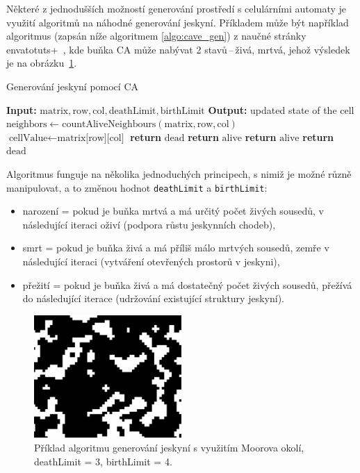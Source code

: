 Některé z jednodušších možností generování prostředí s celulárními automaty je využití algoritmů na náhodné generování jeskyní. Příkladem může být například algoritmus (zapsán níže algoritmem \ref{algo:cave_gen}) z naučné stránky envatotuts+~\cite{CaveCA}, kde buňka CA může nabývat 2 stavů\,--\,živá, mrtvá, jehož výsledek je na obrázku~\ref{fig:cave}.
\begin{algorithm}
\caption{Generování jeskyní pomocí CA}\label{algo:cave_gen}
\begin{algorithmic}[1]
\State \textbf{Input:} $\text{matrix}, \text{row}, \text{col}, \text{deathLimit}, \text{birthLimit}$
\State \textbf{Output:} updated state of the cell
\State $\text{neighbors} \gets \text{countAliveNeighbours}(\text{matrix}, \text{row}, \text{col})$
\State $\text{cellValue} \gets \text{matrix[row][col]}$
      
        \State \textbf{return} $\text{dead}$
    \Else
        \State \textbf{return} $\text{alive}$
    \EndIf
\Else
      
        \State \textbf{return} $\text{alive}$
    \Else
        \State \textbf{return} $\text{dead}$
    \EndIf
\EndIf
\end{algorithmic}
\end{algorithm}
\newline
Algoritmus funguje na několika jednoduchých principech, s nimiž je možné různě manipulovat, a to změnou hodnot \verb|deathLimit| a \verb|birthLimit|:
\begin{itemize}
    \item narození = pokud je buňka mrtvá a má určitý počet živých sousedů, v následující iteraci oživí (podpora růstu jeskynních chodeb),
    \item smrt = pokud je buňka živá a má příliš málo mrtvých sousedů, zemře v následující iteraci (vytváření otevřených prostorů v jeskyni),
    \item přežití = pokud je buňka živá a má dostatečný počet živých sousedů, přežívá do následující iterace (udržování existující struktury jeskyní).
\end{itemize}

\begin{figure}[H]
    \centering
    \includegraphics[width=0.5\textwidth]{obrazky-figures/ch2/cave.png}
    \caption{Příklad algoritmu generování jeskyní s využitím Moorova okolí,	deathLimit = 3, birthLimit = 4.}
    \label{fig:cave}
\end{figure}

